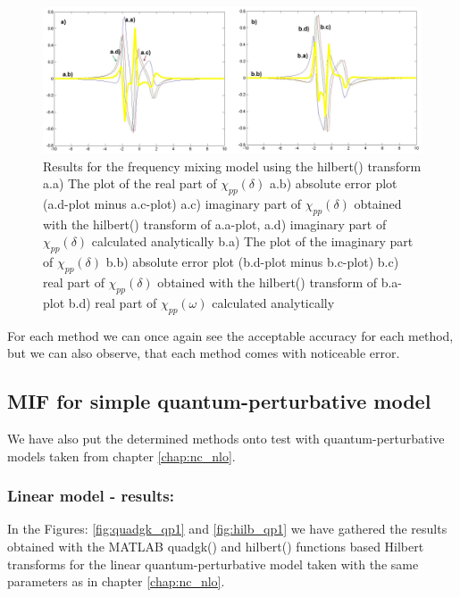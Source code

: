 \documentclass[12pt,twoside,a4paper]{article}
\numberwithin{equation}{subsection}
\numberwithin{figure}{subsection}
\begin{document}
\begin{figure} 
  \includegraphics[width=150mm]{img/hilb_fmix.png}
  \caption{Results for the frequency mixing model using the hilbert() transform
     a.a) The plot of the real part of ${\chi_{pp}}(\delta )$
     a.b) absolute error plot (a.d-plot minus a.c-plot)
     a.c) imaginary part of ${\chi_{pp}}(\delta )$ obtained with the hilbert() transform of a.a-plot, 
     a.d) imaginary part of ${\chi_{pp}}(\delta )$ calculated analytically 
     b.a) The plot of the imaginary part of ${\chi_{pp}}(\delta )$ 
     b.b) absolute error plot (b.d-plot minus b.c-plot)
     b.c) real part of ${\chi_{pp}}(\delta )$ obtained with the hilbert() transform of b.a-plot 
     b.d) real part of $\chi_{pp} (\omega )$ calculated analytically 
     \label{fig:hilb_fmix}
     }
\end{figure} 

For each method we can once again see the acceptable accuracy for each method, but we can also observe, that each method comes
with noticeable error.

\subsection{MIF for simple quantum-perturbative model} \label{chap:matlab_quantum}

We have also put the determined methods onto test with quantum-perturbative models taken from chapter \ref{chap:nc_nlo}.

\subsubsection*{Linear model - results:}

In the Figures: \ref{fig:quadgk_qp1} and \ref{fig:hilb_qp1} we have gathered the results ob\-tained with the MATLAB quadgk() and
hilbert() functions based Hil\-bert tran\-sforms for the linear qua\-ntum\--per\-tur\-ba\-tive model taken with the same para\-meters as in
chapter \ref{chap:nc_nlo}.
\end{document}
